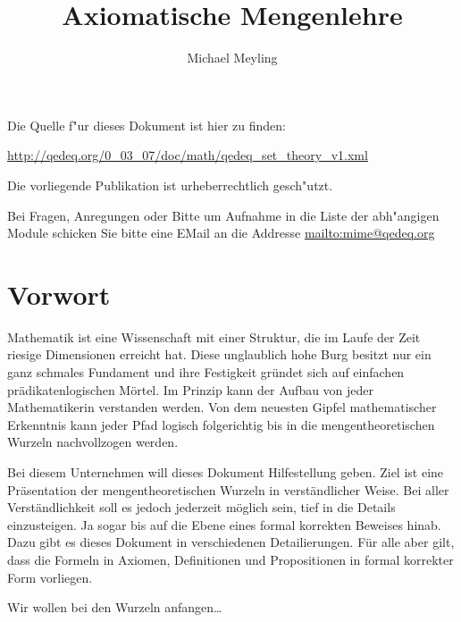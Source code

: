 \documentclass[a4paper,german,10pt,twoside]{book}
\title{Axiomatische Mengenlehre}
\author{
Michael Meyling
}
\theoremstyle{definition}
\theoremstyle{remark}
\begin{document}
\maketitle

\setlength{\parskip}{5pt plus 2pt minus 1pt}
\mbox{}
\vfill

\par
Die Quelle f{"ur} dieses Dokument ist hier zu finden:
\par
\url{http://qedeq.org/0_03_07/doc/math/qedeq_set_theory_v1.xml}

\par
Die vorliegende Publikation ist urheberrechtlich gesch{"u}tzt.
\par
Bei Fragen, Anregungen oder Bitte um Aufnahme in die Liste der abh{"a}ngigen Module schicken Sie bitte eine EMail an die Addresse \url{mailto:mime@qedeq.org}

\setlength{\parskip}{0pt}
\tableofcontents

\setlength{\parskip}{5pt plus 2pt minus 1pt}

\chapter*{Vorwort\label{ch:preface}} \label{chapter0} \hypertarget{chapter0}{}

Mathematik ist eine Wissenschaft mit einer Struktur, die im Laufe der Zeit riesige Dimensionen erreicht hat. Diese unglaublich hohe Burg besitzt nur ein ganz schmales Fundament und ihre Festigkeit gr{\"u}ndet sich auf einfachen pr{\"a}dikatenlogischen M{\"o}rtel. Im Prinzip kann der Aufbau von jeder Mathematikerin verstanden werden. Von dem neuesten Gipfel mathematischer Erkenntnis kann jeder Pfad logisch folgerichtig bis in die mengentheoretischen Wurzeln nachvollzogen werden.

\par
Bei diesem Unternehmen will dieses Dokument Hilfestellung geben. Ziel ist eine Pr{\"a}sentation der mengentheoretischen Wurzeln in verst{\"a}ndlicher Weise. Bei aller Verst{\"a}ndlichkeit soll es jedoch jederzeit m{\"o}glich sein, tief in die Details einzusteigen. Ja sogar bis auf die Ebene eines formal korrekten Beweises hinab. Dazu gibt es dieses Dokument in verschiedenen Detailierungen. F{\"u}r alle aber gilt, dass die Formeln in Axiomen, Definitionen und Propositionen in formal korrekter Form vorliegen.

\par
Wir wollen bei den Wurzeln anfangen\ldots
\end{document}
